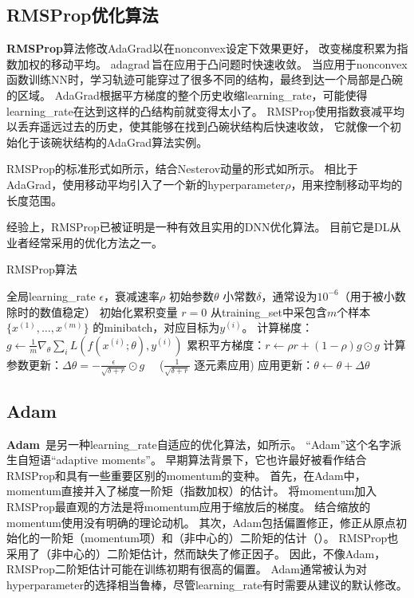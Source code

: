 \subsection{RMSProp优化算法}
\label{sec:rmsprop}
\textbf{RMSProp}算法\citep{Hinton-ipam2012}修改AdaGrad以在\gls{nonconvex}设定下效果更好，
改变梯度积累为指数加权的移动平均。
\gls{adagrad}\,旨在应用于凸问题时快速收敛。
当应用于\gls{nonconvex}函数训练\gls{NN}时，学习轨迹可能穿过了很多不同的结构，最终到达一个局部是凸碗的区域。
AdaGrad根据平方梯度的整个历史收缩\gls{learning_rate}，可能使得\gls{learning_rate}在达到这样的凸结构前就变得太小了。
RMSProp使用指数衰减平均以丢弃遥远过去的历史，使其能够在找到凸碗状结构后快速收敛，
它就像一个初始化于该碗状结构的AdaGrad算法实例。

RMSProp的标准形式如所示，结合Nesterov动量的形式如所示。
相比于AdaGrad，使用移动平均引入了一个新的\gls{hyperparameter}$\rho$，用来控制移动平均的长度范围。

经验上，RMSProp已被证明是一种有效且实用的\gls{DNN}优化算法。
目前它是\gls{DL}从业者经常采用的优化方法之一。


\begin{algorithm}[ht]
	\caption{RMSProp算法}
	\label{alg:rms_prop}
	\begin{algorithmic}
		\REQUIRE 全局\gls{learning_rate} $\epsilon$，衰减速率$\rho$
		\REQUIRE  初始参数$\theta$
		\REQUIRE 小常数$\delta$，通常设为$10^{-6}$（用于被小数除时的数值稳定）
		\STATE 初始化累积变量 $r = 0$
		\STATE 从\gls{training_set}中采包含$m$个样本$\{ x^{(1)},\dots, x^{(m)}\}$ 的\gls{minibatch}，对应目标为$y^{(i)}$。
		\STATE 计算梯度：$g \leftarrow  
		\frac{1}{m} \nabla_{\theta} \sum_i L(f(x^{(i)};\theta),y^{(i)})$ 
		\STATE 累积平方梯度：$r \leftarrow \rho
		r + (1-\rho) g \odot g$
		\STATE 计算参数更新：$\Delta \theta =
		-\frac{\epsilon}{\sqrt{\delta + r}} \odot g$  \ \  ($\frac{1}{\sqrt{\delta + r}}$ 逐元素应用)
		\STATE 应用更新：$\theta \leftarrow \theta + \Delta \theta$
		\ENDWHILE
	\end{algorithmic}
\end{algorithm}

\subsection{Adam}
\label{sec:adam}
\textbf{Adam}~\citep{kingma2014adam}是另一种\gls{learning_rate}自适应的优化算法，如所示。
``Adam''这个名字派生自短语``adaptive moments''。
早期算法背景下，它也许最好被看作结合RMSProp和具有一些重要区别的\gls{momentum}的变种。
首先，在Adam中，\gls{momentum}直接并入了梯度一阶矩（指数加权）的估计。
将\gls{momentum}加入RMSProp最直观的方法是将\gls{momentum}应用于缩放后的梯度。
结合缩放的\gls{momentum}使用没有明确的理论动机。
其次，Adam包括偏置修正，修正从原点初始化的一阶矩（\gls{momentum}项）和（非中心的）二阶矩的估计（）。
RMSProp也采用了（非中心的）二阶矩估计，然而缺失了修正因子。
因此，不像Adam，RMSProp二阶矩估计可能在训练初期有很高的偏置。
Adam通常被认为对\gls{hyperparameter}的选择相当鲁棒，尽管\gls{learning_rate}有时需要从建议的默认修改。

